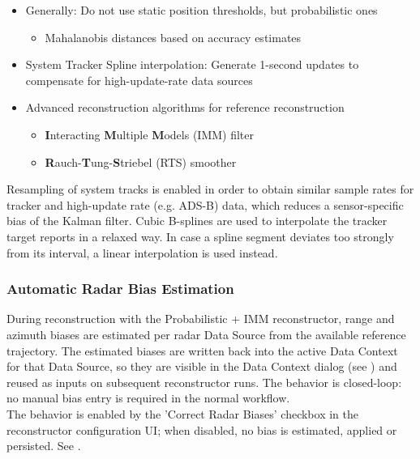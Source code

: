 \begin{itemize}
\begin{itemize}
\item Only usable if 'Rescaling Accuracies' is enabled
\end{itemize}
\item Generally: Do not use static position thresholds, but probabilistic ones
\begin{itemize}
\item Mahalanobis distances based on accuracy estimates
\end{itemize}
\item System Tracker Spline interpolation: Generate 1-second updates to compensate for high-update-rate data sources
\item Advanced reconstruction algorithms for reference reconstruction
\begin{itemize}
\item \textbf{I}nteracting \textbf{M}ultiple \textbf{M}odels (IMM) filter
\item \textbf{R}auch-\textbf{T}ung-\textbf{S}triebel (RTS) smoother
\end{itemize}
\end{itemize}


Resampling of system tracks is enabled in order to obtain similar sample rates for tracker and high-update rate (e.g. ADS-B) data, which reduces a sensor-specific bias of the Kalman filter.
Cubic B-splines are used to interpolate the tracker target reports in a relaxed way. In case a spline segment deviates too strongly from its interval, a linear interpolation is used instead. \\

\subsubsection{Automatic Radar Bias Estimation}
\label{sec:reconst_radar_bias_estimation}

During reconstruction with the Probabilistic + IMM reconstructor, range and azimuth biases are estimated per radar Data Source from the available reference trajectory. The estimated biases are written back into the active Data Context for that Data Source, so they are visible in the Data Context dialog (see ) and reused as inputs on subsequent reconstructor runs. The behavior is closed-loop: no manual bias entry is required in the normal workflow. \\

The behavior is enabled by the 'Correct Radar Biases' checkbox in the reconstructor configuration UI; when disabled, no bias is estimated, applied or persisted. See .

